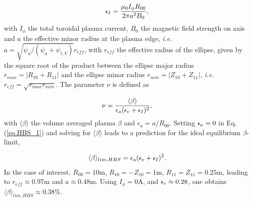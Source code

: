 \documentclass[my_thesis.tex]{subfiles}
\begin{document}
\begin{equation}
	\text{$\iota\!\!$-}_I = \frac{\mu_0I_\phi R_{00}}{2\pi a^2B_0},
\end{equation}
with $I_\phi$ the total toroidal plasma current, $B_0$ the magnetic field strength on axis and $a$ the effective minor radius at the plasma edge, \textit{i.e.} $a=\sqrt{\psi_a / (\psi_a + \psi_{t,V})} r_{eff}$, with $r_{eff}$ the effective radius of the ellipse, given by the square root of the product between the ellipse major radius $r_{max}=|R_{10}+R_{11}|$ and the ellipse minor radius $r_{min}=|Z_{10}+Z_{11}|$, \textit{i.e.} $r_{eff}=\sqrt{r_{max}r_{min}}$. The parameter $\nu$ is defined as

\begin{equation}
	\nu = \frac{\langle\beta\rangle}{\epsilon_a(\text{$\iota\!\!$-}_v+\text{$\iota\!\!$-}_I)^2},
\end{equation}
with $\langle\beta\rangle$ the volume averaged plasma $\beta$ and $\epsilon_a = a / R_{00}$. Setting $\text{$\iota\!\!$-}_a=0$ in Eq.(\ref{eq.HBS_1}) and solving for $\langle\beta\rangle$ leads to a prediction for the ideal equilibrium $\beta$-limit,

\begin{equation}
	\langle\beta\rangle_{lim,HBS} = \epsilon_a(\text{$\iota\!\!$-}_v+\text{$\iota\!\!$-}_I)^2.
\end{equation}
In the case of interest, $R_{00}=10$m, $R_{10}=-Z_{10}=1$m, $R_{11}=Z_{11}=0.25$m, leading to $r_{eff}\approx0.97$m and $a\approx0.48$m. Using $I_\phi=0$A, and $\text{$\iota\!\!$-}_v\approx0.28$, one obtains $\langle\beta\rangle_{lim,HBS}\approx0.38\%$.
\end{document}
